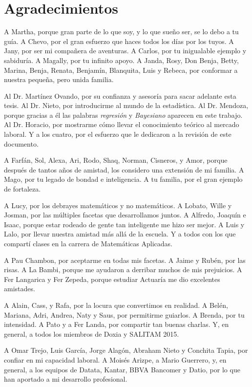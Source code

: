 \clearpage
\setcounter{page}{1}
\chapter*{Agradecimientos}
A Martha, porque gran parte de lo que soy, y lo que sueño ser, se lo debo a tu gu\'ia. A Chevo, por el gran esfuerzo que haces todos los d\'ias por los tuyos. A Jany, por ser mi compañera de aventuras. A Carlos, por tu inigualable ejemplo y sabidur\'ia. A Magally, por tu infinito apoyo. A Janda, Rosy, Don Benja, Betty, Marina, Benja, Renata, Benjam\'in, Blanquita, Luis y Rebeca, por conformar a nuestra pequeña, pero unida familia.

Al Dr. Mart\'inez Ovando, por su confianza y asesor\'ia para sacar adelante esta tesis. Al Dr. Nieto, por introducirme al mundo de la estad\'istica. Al Dr. Mendoza, porque gracias a \'el las palabras \textit{regresi\'on} y \textit{Bayesiano} aparecen en este trabajo. Al Dr. Horacio, por mostrarme c\'omo llevar el conocimiento te\'orico al mercado laboral. Y a los cuatro, por el esfuerzo que le dedicaron a la revisi\'on de este documento.

A Farf\'an, Sol, Alexa, Ari, Rodo, Shaq, Norman, Cisneros, y Amor, porque despu\'es de tantos años de amistad, los considero una extensi\'on de mi familia. A Mago, por tu legado de bondad e inteligencia. A tu familia, por el gran ejemplo de fortaleza. 

A Lucy, por los debrayes matem\'aticos y no matem\'aticos. A Lobato, Wille y Josman, por las m\'ultiples facetas que desarrollamos juntos. A Alfredo, Joaquín e Isaac, porque estar rodeado de gente tan inteligente me hizo ser mejor. A Luis y Lalo, por llevar nuestra amistad m\'as all\'a de la escuela. Y a todos con los que compart\'i clases en la carrera de Matem\'aticas Aplicadas.

A Pau Chambon, por aceptarme en todas mis facetas. A Jaime y Rubén, por las risas. A La Bambi, porque me ayudaron a derribar muchos de mis prejuicios. A Fer Langarica y Fer Zepeda, porque estudiar Actuar\'ia me dio excelentes amistades.

A Alain, Cass, y Rafa, por la locura que convertimos en realidad. A Belén, Mariana, Adri, Andrea, Naty y Saus, por permitirme guiarlos. A Brenda, por tu intensidad. A Pato y a Fer Landa, por compartir tan buenas charlas. Y, en general, a todos los miembros de Doxia y SALITAM 2015. 

A Omar Trejo, Luis Garc\'ia, Jorge Alag\'on, Abraham Nieto y Conchita Tapia, por confiar en mi capacidad laboral. A Mois\'es Arizpe, a Mario Guerrero, y, en general, a los equipos de Datata, Kantar, BBVA Bancomer y Datio, por lo que han aportado a mi desarrollo profesional.

